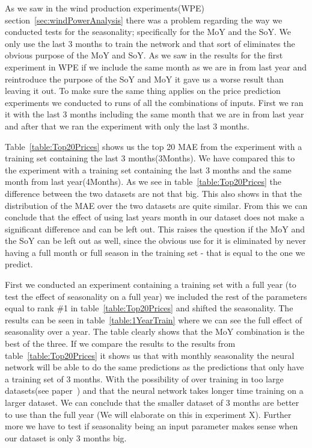 As we saw in the wind production experiments(WPE) section~\ref{sec:windPowerAnalysis} there was a problem regarding the way we conducted tests for the seasonality; specifically for the MoY and the SoY. We only use the last 3 months to train the network and that sort of eliminates the obvious purpose of the MoY and SoY. As we saw in the results for the first experiment in WPE if we include the same month as we are in from last year and reintroduce the purpose of the SoY and MoY it gave us a worse result than leaving it out. To make sure the same thing applies on the price prediction experiments we conducted to runs of all the combinations of inputs. First we ran it with the last 3 months including the same month that we are in from last year and after that we ran the experiment with only the last 3 months.

Table~\ref{table:Top20Prices} shows us the top 20 MAE from the experiment with a training set containing the last 3 months(3Months). We have compared this to the experiment with a training set containing the last 3 months and the same month from last year(4Months). As we see in table~\ref{table:Top20Prices} the difference between the two datasets are not that big. This also shows in  that the distribution of the MAE over the two datasets are quite similar. From this we can conclude that the effect of using last years month in our dataset does not make a significant difference and can be left out. This raises the question if the MoY and the SoY can be left out as well, since the obvious use for it is eliminated by never having a full month or full season in the training set - that is equal to the one we predict.

First we conducted an experiment containing a training set with a full year (to test the effect of seasonality on a full year) we included the rest of the parameters equal to rank \#1 in table~\ref{table:Top20Prices} and shifted the seasonality. The results can be seen in table~\ref{table:1YearTrain} where we can see the full effect of seasonality over a year. The table clearly shows that the MoY combination is the best of the three. If we compare the results to the results from table~\ref{table:Top20Prices} it shows us that with monthly seasonality the neural network will be able to do the same predictions as the predictions that only have a training set of 3 months. With the possibility of over training in too large datasets(see paper~\cite{1}) and that the neural network takes longer time training on a larger dataset. We can conclude that the smaller dataset of 3 months are better to use than the full year (We will elaborate on this in experiment X). Further more we have to test if seasonality being an input parameter makes sense when our dataset is only 3 months big.

